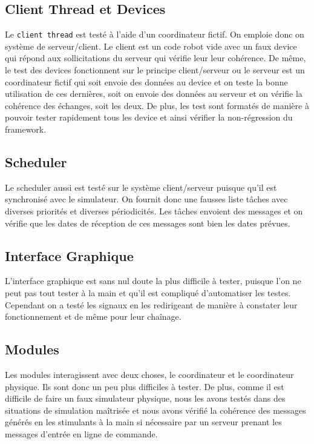 \label{lestests}
\subsection{Client Thread et Devices}

Le \texttt{client thread} est testé à l'aide d'un coordinateur fictif. On emploie donc on système de serveur/client. Le client est un code robot vide avec un faux device qui répond aux sollicitations du serveur qui vérifie leur leur cohérence. De même, le test des devices fonctionnent sur le principe client/serveur ou le serveur est un coordinateur fictif qui soit envoie des données au device et on teste la bonne utilisation de ces dernières, soit on envoie des données au serveur et on vérifie la cohérence des échanges, soit les deux. De plus, les test sont formatés de manière à pouvoir tester rapidement tous les device et ainsi vérifier la non-régression du framework.
 
\subsection{Scheduler}

Le scheduler aussi est testé sur le système client/serveur puisque qu'il est synchronisé avec le simulateur. On fournit donc une fausses liste tâches avec diverses priorités et diverses périodicités. Les tâches envoient des messages et on vérifie que les dates de réception de ces messages sont bien les dates prévues.


\subsection{Interface Graphique}

L'interface graphique est sans nul doute la plus difficile à tester, puisque l'on ne peut pas tout tester à la main et qu'il est compliqué d'automatiser les testes. Cependant on a testé les signaux en les redirigeant de manière à constater leur fonctionnement et de même pour leur chaînage.

\subsection{Modules}

Les modules interagissent avec deux choses, le coordinateur et le coordinateur physique. Ils sont donc un peu plus difficiles à tester. De plus, comme il est difficile de faire un faux simulateur physique, nous les avons testés dans des situations de simulation maîtrisée et nous avons vérifié la cohérence des messages générés en les stimulants à la main si nécessaire par un serveur prenant les messages d'entrée en ligne de commande.

